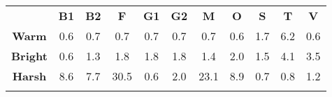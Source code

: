 \begin{tabular}{|c||c|c|c|c|c|c|c|c|c|c|}
	\cline{2-11}
	\multicolumn{1}{c|}{} & \bf{B1} & \bf{B2} & \bf{F} & \bf{G1} & \bf{G2} & \bf{M} & \bf{O} & \bf{S} & \bf{T} & \bf{V} \tabularnewline
	\hhline{~|-|-|-|-|-|-|-|-|-|-|}
	\noalign{\vspace{\doublerulesep}}
	\hhline{-||-|-|-|-|-|-|-|-|-|-|}
	\bf{Warm} & 0.6 & 0.7 & 0.7 & 0.7 & 0.7 & 0.7 & 0.6 & 1.7 & 6.2 & 0.6 \tabularnewline
	\hhline{-||-|-|-|-|-|-|-|-|-|-|}
	\bf{Bright} & 0.6 & 1.3 & 1.8 & 1.8 & 1.8 & 1.4 & 2.0 & 1.5 & 4.1 & 3.5 \tabularnewline
	\hhline{-||-|-|-|-|-|-|-|-|-|-|}
	\bf{Harsh} &  8.6 &  7.7 & 30.5 &  0.6 &  2.0 & 23.1 &  8.9 &  0.7 &  0.8 &  1.2 \tabularnewline
	\hhline{-||-|-|-|-|-|-|-|-|-|-|}
\end{tabular}
